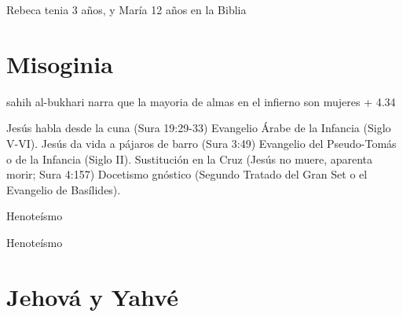 \documentclass[12pt]{report}
\begin{document}
	\begin{minibloque}[Objeción]
		Rebeca tenia 3 años, y María 12 años en la Biblia
	\end{minibloque}
	
	
	\section{Misoginia}
	sahih al-bukhari narra que la mayoria de almas en el infierno son mujeres + 4.34
	
	

	
	
	Jesús habla desde la cuna (Sura 19:29-33)	Evangelio Árabe de la Infancia (Siglo V-VI).
	Jesús da vida a pájaros de barro (Sura 3:49)	Evangelio del Pseudo-Tomás o de la Infancia (Siglo II).
	Sustitución en la Cruz (Jesús no muere, aparenta morir; Sura 4:157)	Docetismo gnóstico (Segundo Tratado del Gran Set o el Evangelio de Basílides).
	
	
	
	
	Henoteísmo
	
	Henoteísmo
	
	
	\section{Jehová y Yahvé}
	
\end{document}
